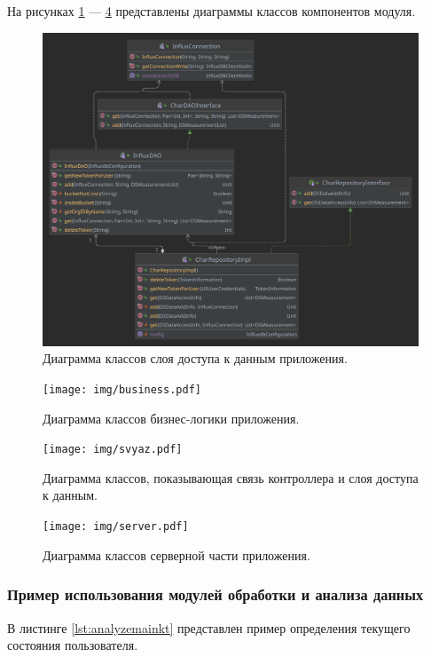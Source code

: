 На рисунках \ref{fig:dostup} --- \ref{fig:server} представлены диаграммы классов компонентов модуля.

\begin{figure}[H]
	\centering
	\includegraphics[width=\textwidth]{img/dostup.pdf}
	\caption{Диаграмма классов слоя доступа к данным приложения.}
	\label{fig:dostup}
\end{figure}

\begin{figure}[H]
	\centering
	\texttt{[image: img/business.pdf]}
	\caption{Диаграмма классов бизнес-логики приложения.}
	\label{fig:business}
\end{figure}

\begin{figure}[H]
	\centering
	\texttt{[image: img/svyaz.pdf]}
	\caption{Диаграмма классов, показывающая связь контроллера и слоя доступа к данным.}
	\label{fig:svyaz}
\end{figure}

\begin{figure}[H]
	\centering
	\texttt{[image: img/server.pdf]}
	\caption{Диаграмма классов серверной части приложения.}
	\label{fig:server}
\end{figure}

\subsubsection{Пример использования модулей обработки и анализа данных}

В листинге \ref{lst:analyzemainkt} представлен пример определения текущего состояния \newline пользователя.

